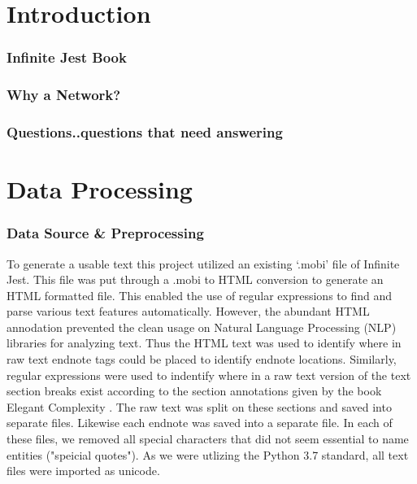\documentclass[12pt]{article}
\begin{document}
\maketitle

\section*{Introduction}

\subsubsection*{Infinite Jest Book}

\subsubsection*{Why a Network?}

\subsubsection*{Questions..questions that need answering}

\section*{Data Processing}

\subsubsection*{Data Source \& Preprocessing}
To generate a usable text this project utilized an existing `.mobi' file of Infinite Jest. This file was put through a .mobi to HTML conversion to generate an HTML formatted file. This enabled the use of regular expressions to find and parse various text features automatically. However, the abundant HTML annodation prevented the clean usage on Natural Language Processing (NLP) libraries for analyzing text. Thus the HTML text was used to identify where in raw text endnote tags could be placed to identify endnote locations. Similarly, regular expressions were used to indentify where in a raw text version of the text section breaks exist according to the section annotations given by the book Elegant Complexity \cite{carlisle_2007}. The raw text was split on these sections and saved into separate files. Likewise each endnote was saved into a separate file. In each of these files, we removed all special characters that did not seem essential to name entities ("speicial quotes"). As we were utlizing the Python 3.7 standard, all text files were imported as unicode.
\end{document}
